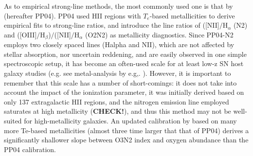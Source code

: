 \documentclass{emulateapj}
\begin{document}
As to empirical strong-line methods, the most commonly used one is that by \citet{pettini04} (hereafter PP04). PP04 used HII regions with $T_e$-based metallicities to derive empirical fits to strong-line ratios, and introduce the line ratios of ([NII]$/$H$_\alpha$ (N2) and ([OIII]$/$H$_\beta$)$/$([NII]$/$H$_\alpha$ (O2N2) as metallicity diagnostics. Since PP04-N2 employs two closely spaced lines (Halpha and NII), which are not affected by stellar absorption, nor uncertain reddening, and are easily observed in one simple spectroscopic setup, it has become an often-used scale for at least low-z SN host galaxy studies (e.g. see metal-analysis by e.g,. \citealt{sanders12,modjaz12_proc,leloudas14}). However, it is important to remember that this scale has a number of short-comings: it does not take into account the impact of the ionization parameter, it was initially derived based on only 137 extragalactic HII regions, and the nitrogen emission line employed saturates at high metallicity (\textbf{CHECK!}), and thus this method may not be well-suited for high-metallicity galaxies. An updated calibration by \citet{marino13} based on many more Te-based metallicities (almost three time larger that that of PP04) derives a significantly shallower slope between O3N2 index and oxygen abundance than the PP04 calibration.
\end{document}
